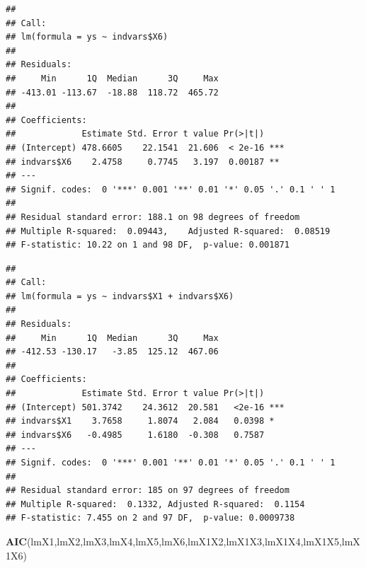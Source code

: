\documentclass[
]{book}
\newenvironment{Shaded}{\begin{snugshade}}{\end{snugshade}}
\newcommand{\FunctionTok}[1]{\textcolor[rgb]{0.13,0.29,0.53}{\textbf{#1}}}
\newcommand{\NormalTok}[1]{#1}
\newcommand{\OtherTok}[1]{\textcolor[rgb]{0.56,0.35,0.01}{#1}}
\newcommand{\SpecialCharTok}[1]{\textcolor[rgb]{0.81,0.36,0.00}{\textbf{#1}}}
\begin{document}
\begin{Shaded}
\end{Shaded}

\begin{verbatim}
## 
## Call:
## lm(formula = ys ~ indvars$X6)
## 
## Residuals:
##     Min      1Q  Median      3Q     Max 
## -413.01 -113.67  -18.88  118.72  465.72 
## 
## Coefficients:
##             Estimate Std. Error t value Pr(>|t|)    
## (Intercept) 478.6605    22.1541  21.606  < 2e-16 ***
## indvars$X6    2.4758     0.7745   3.197  0.00187 ** 
## ---
## Signif. codes:  0 '***' 0.001 '**' 0.01 '*' 0.05 '.' 0.1 ' ' 1
## 
## Residual standard error: 188.1 on 98 degrees of freedom
## Multiple R-squared:  0.09443,    Adjusted R-squared:  0.08519 
## F-statistic: 10.22 on 1 and 98 DF,  p-value: 0.001871
\end{verbatim}

\begin{Shaded}
\end{Shaded}

\begin{verbatim}
## 
## Call:
## lm(formula = ys ~ indvars$X1 + indvars$X6)
## 
## Residuals:
##     Min      1Q  Median      3Q     Max 
## -412.53 -130.17   -3.85  125.12  467.06 
## 
## Coefficients:
##             Estimate Std. Error t value Pr(>|t|)    
## (Intercept) 501.3742    24.3612  20.581   <2e-16 ***
## indvars$X1    3.7658     1.8074   2.084   0.0398 *  
## indvars$X6   -0.4985     1.6180  -0.308   0.7587    
## ---
## Signif. codes:  0 '***' 0.001 '**' 0.01 '*' 0.05 '.' 0.1 ' ' 1
## 
## Residual standard error: 185 on 97 degrees of freedom
## Multiple R-squared:  0.1332, Adjusted R-squared:  0.1154 
## F-statistic: 7.455 on 2 and 97 DF,  p-value: 0.0009738
\end{verbatim}

\begin{Shaded}
\begin{Highlighting}[]
\FunctionTok{AIC}\NormalTok{(lmX1,lmX2,lmX3,lmX4,lmX5,lmX6,lmX1X2,lmX1X3,lmX1X4,lmX1X5,lmX1X6)}
\end{Highlighting}
\end{Shaded}
\end{document}
